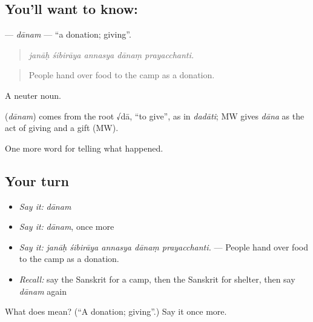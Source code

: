 \subsection*{You'll want to know: }
\textbf{} — \emph{dānam} — \textquotedblleft{}a donation; giving\textquotedblright{}.

\begin{quote}
    
\end{quote}

\begin{quote}
\emph{janāḥ śibirāya annasya dānaṃ prayacchanti.}
\end{quote}

\begin{quote}
People hand over food to the camp as a donation.
\end{quote}

A neuter noun.

\begin{cousinweb}
\textbf{} (\emph{dānam}) comes from the root √dā, \textquotedblleft{}to give\textquotedblright{}, as in \emph{dadāti}; MW gives \emph{dāna} as the act of giving and a gift (MW).
\end{cousinweb}

\begin{grammarlens}[title={What you've built}]
One more word for telling what happened.
\end{grammarlens}

\subsection*{Your turn}
\begin{itemize}
\raggedright
  \item \emph{Say it:} \emph{dānam}
  \item \emph{Say it:} \emph{dānam}, once more
  \item \emph{Say it:} \emph{janāḥ śibirāya annasya dānaṃ prayacchanti.} — People hand over food to the camp as a donation.
  \item \emph{Recall:} say the Sanskrit for a camp, then the Sanskrit for shelter, then say \emph{dānam} again
\end{itemize}

\begin{tcolorbox}[breakable,colback=teal!4,colframe=teal!35!black,title={Before you move on}]
What does  mean? (\textquotedblleft{}A donation; giving\textquotedblright{}.) Say it once more.
\end{tcolorbox}
